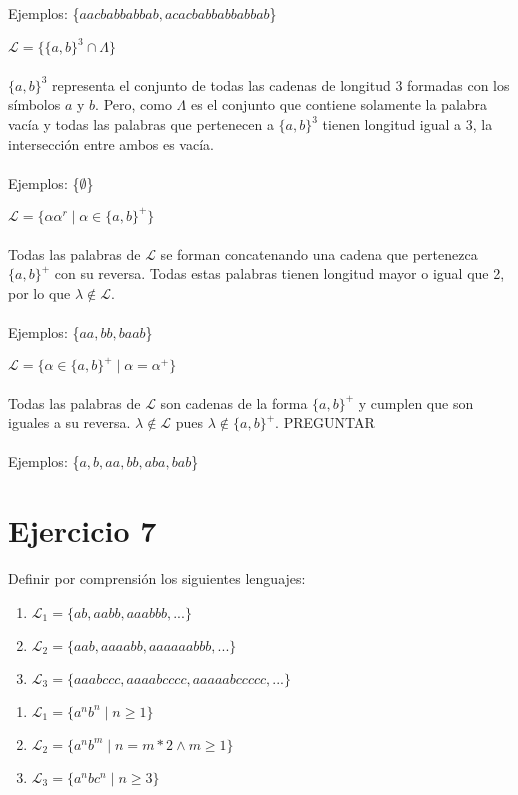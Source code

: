 \documentclass[12pt]{article}
\begin{document}
\begin{enumerate}[label=\roman*.,font=\itshape]
{{{    \\
    \\
    Ejemplos: \{$aacbabbabbab, acacbabbabbabbab$\}}
    \item {$\mathcal{L} =\{\{a,b\}^3 \cap \Lambda\}$
    \\
    \\    
    {$\{a,b\}^3$ representa el conjunto de todas las cadenas de longitud $3$ formadas con los símbolos $a$ y $b$. Pero, como $\Lambda$ es el conjunto que contiene solamente la palabra vacía y todas las palabras que pertenecen a $\{a,b\}^3$ tienen longitud igual a $3$, la intersección entre ambos es vacía.}
    \\
    \\
    Ejemplos: \{$\emptyset$\}}
    \item {$\mathcal{L} = \{ \alpha\alpha^r \mid \alpha \in \{a,b\}^+\}$
    \\
    \\    
    {Todas las palabras de $\mathcal{L}$ se forman concatenando una cadena que pertenezca $\{a,b\}^+$ con su reversa. Todas estas palabras tienen longitud mayor o igual que 2, por lo que $\lambda \notin \mathcal{L}$.}
    \\
    \\
    Ejemplos: \{$aa, bb, baab$\}}
    \item {$\mathcal{L} = \{ \alpha \in \{a,b\}^+ \mid \alpha = \alpha^+\}$
    \\
    \\    
    {Todas las palabras de $\mathcal{L}$ son cadenas de la forma $\{a,b\}^+$ y cumplen que son iguales a su reversa. $\lambda \notin \mathcal{L}$ pues $\lambda \notin \{a,b\}^+$. PREGUNTAR}
    \\
    \\
    Ejemplos: \{$a, b, aa, bb, aba, bab$\}}}
    }
\end{enumerate}

\section*{Ejercicio 7}
Definir por comprensión los siguientes lenguajes:
\begin{enumerate}[label=\Roman*.]
    \item $\mathcal{L}_1 = \{ab, aabb, aaabbb,...\}$
    \item $\mathcal{L}_2 = \{aab, aaaabb, aaaaaabbb,...\}$
    \item $\mathcal{L}_3 = \{aaabccc, aaaabcccc, aaaaabccccc,...\}$
\end{enumerate}
\begin{enumerate}[label=\roman*.,font=\itshape]
    \item $\mathcal{L}_1 = \{a^nb^n \mid n\geq 1\}$
    \item $\mathcal{L}_2 = \{a^nb^m \mid n =m*2 \land m\geq1\}$
    \item $\mathcal{L}_3 = \{a^nbc^n \mid n\geq3\}$
\end{enumerate}
\end{document}
